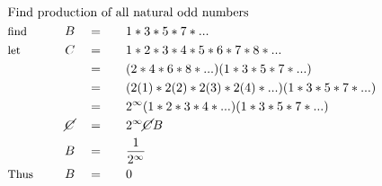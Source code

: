 \begin{alignat*}{5}
&\rlap{\text{Find production of all natural odd numbers}}\\
&\small\text{find}\normalsize\qquad&B\quad&=\quad&&1*3*5*7*...\\
&\small\text{let}&C\quad&=&&1*2*3*4*5*6*7*8*...\\
&\,&\,&=&&(2*4*6*8*...)(1*3*5*7*...)\\
&\,&\,&=&&(2(1)*2(2)*2(3)*2(4)*...)(1*3*5*7*...)\\
&\,&\,&=&&2^\infty(1*2*3*4*...)(1*3*5*7*...)\\
&\,&\cancel{C}\quad&=&&2^\infty\cancel{C}B\\
&\,&B\quad&=&&\frac{1}{2^\infty}\\
&\small\text{Thus}&B\quad&=&&0
\end{alignat*}
